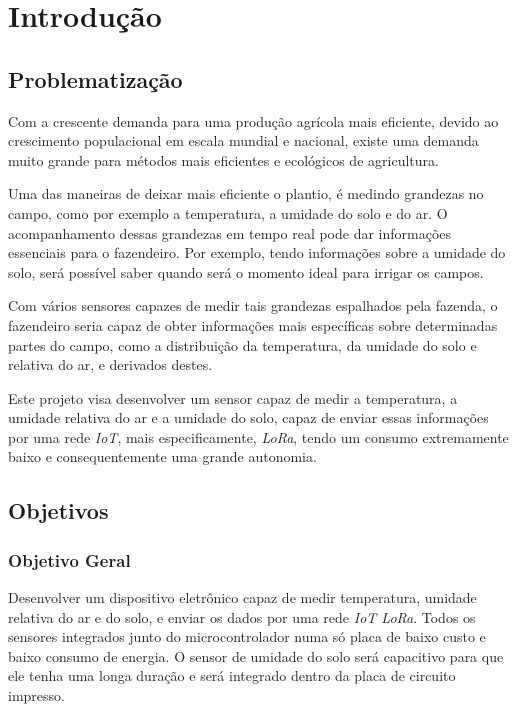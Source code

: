 \chapter{Introdução} \label{chapter:intro}

\vspace{-0.1cm}

\section{Problematização}

\par
Com a crescente demanda para uma produção agrícola mais eficiente, devido ao
crescimento populacional em escala mundial e nacional, existe uma demanda muito grande
para métodos mais eficientes e ecológicos de agricultura.

Uma das maneiras de deixar mais eficiente o plantio, é medindo grandezas no
campo, como por exemplo a temperatura, a umidade do solo e do ar. O
acompanhamento dessas grandezas em tempo real pode dar informações essenciais
para o fazendeiro. Por exemplo, tendo informações sobre a umidade do solo, será
possível saber quando será o momento ideal para irrigar os campos.

Com vários sensores capazes de medir tais grandezas espalhados pela fazenda, o
fazendeiro seria capaz de obter informações mais específicas sobre determinadas
partes do campo, como a distribuição da temperatura, da umidade do solo e
relativa do ar, e derivados destes.

Este projeto visa desenvolver um sensor capaz de medir a
temperatura, a umidade relativa do ar e a umidade do solo, capaz de
enviar essas informações por uma rede \textit{IoT}, mais especificamente,
\textit{LoRa}, tendo um consumo extremamente baixo e consequentemente uma
grande autonomia.

\section{Objetivos}

\subsection{Objetivo Geral}
Desenvolver um dispositivo eletrônico capaz de medir temperatura, umidade relativa do ar
e do solo, e enviar os dados por uma rede \textit{IoT LoRa}. Todos os sensores
integrados junto do microcontrolador numa só placa de baixo custo e baixo consumo de energia.
O sensor de umidade do solo será capacitivo para que ele tenha uma longa duração
e será integrado dentro da placa de circuito impresso.

